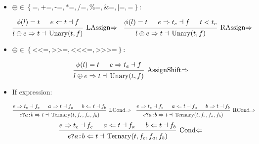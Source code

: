 \documentclass{article}
\DeclareMathOperator{\Unary}{Unary}
\DeclareMathOperator{\Ternary}{Ternary}
\newcommand{\assignBinOp}{\ensuremath{\left\{
      \texttt{=}, \texttt{+=}, \texttt{-=}, \texttt{*=}, \texttt{/=},
      \texttt{\%=}, \texttt{\&=}, \texttt{|=}, \texttt{\^{}=}
    \right\}}}
\newcommand{\assignShift}{\ensuremath{\left\{
      \texttt{<}\texttt{<=}, \texttt{>>=},
      \texttt{<}\texttt{<}\texttt{<=}, \texttt{>>>=}
    \right\}}}
\renewcommand{\S}{\ensuremath{\Rightarrow}}
\newcommand{\C}{\ensuremath{\Leftarrow}}
\newcommand{\s}[3]{#1 \S{} #2 \dashv{} #3}
\renewcommand{\c}[3]{#1 \C{} #2 \dashv{} #3}
\begin{document}
\begin{itemize}[leftmargin=*]
    \item $\oplus \in \assignBinOp$:

          \begin{align*}
               &
              \begin{prooftree}
                  \hypo{\phi(l) = t}
                  \hypo{\c{e}{t}{f}}
                  \infer2[LAssign\S]{\s{l \oplus e}{t}{\Unary(t, f)}}
              \end{prooftree}
               &
               &
              \begin{prooftree}
                  \hypo{\phi(l) = t}
                  \hypo{\s{e}{t_e}{f}}
                  \hypo{t < t_e}
                  \infer3[RAssign\S]{\s{l \oplus e}{t}{\Unary(t, f)}}
              \end{prooftree}
          \end{align*}


    \item $\oplus \in \assignShift$:

          \begin{equation*}
              \begin{prooftree}
                  \hypo{\phi(l) = t}
                  \hypo{\s{e}{t_e}{f}}
                  \infer2[AssignShift\S]{\s{l \oplus e}{t}{\Unary(t, f)}}
              \end{prooftree}
          \end{equation*}


    \item If expression:

          \begin{align*}
               &
              \begin{prooftree}
                  \hypo{\s{e}{t_e}{f_e}}
                  \hypo{\s{a}{t}{f_a}}
                  \hypo{\c{b}{t}{f_b}}
                  \infer3[LCond\S]{\s{e \texttt{?} a \texttt{:} b}{t}{\Ternary(t, f_e, f_a, f_b)}}
              \end{prooftree}
               &
               &
              \begin{prooftree}
                  \hypo{\s{e}{t_e}{f_e}}
                  \hypo{\c{a}{t}{f_a}}
                  \hypo{\s{b}{t}{f_b}}
                  \infer3[RCond\S]{\s{e \texttt{?} a \texttt{:} b}{t}{\Ternary(t, f_e, f_a, f_b)}}
              \end{prooftree}
          \end{align*}
          \vspace*{.5em}
          \begin{equation*}
              \begin{prooftree}
                  \hypo{\s{e}{t_e}{f_e}}
                  \hypo{\c{a}{t}{f_a}}
                  \hypo{\c{b}{t}{f_b}}
                  \infer3[Cond\C]{\c{e \texttt{?} a \texttt{:} b}{t}{\Ternary(t, f_e, f_a, f_b)}}
              \end{prooftree}
          \end{equation*}



\end{itemize}
\end{document}
